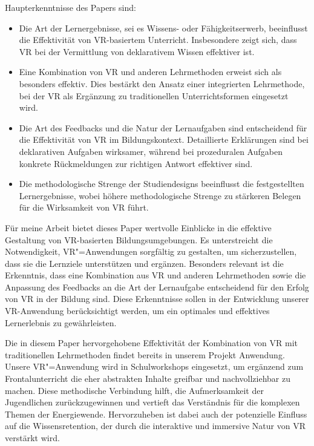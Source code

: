 \documentclass[draft]{vutinfth} %
\begin{document}
Haupterkenntnisse des Papers sind:
\begin{itemize}
    \item Die Art der Lernergebnisse, sei es Wissens- oder Fähigkeitserwerb, beeinflusst die Effektivität von VR-basiertem Unterricht. Insbesondere zeigt sich, dass VR bei der Vermittlung von deklarativem Wissen effektiver ist.

    \item Eine Kombination von VR und anderen Lehrmethoden erweist sich als besonders effektiv. Dies bestärkt den Ansatz einer integrierten Lehrmethode, bei der VR als Ergänzung zu traditionellen Unterrichtsformen eingesetzt wird.

    \item Die Art des Feedbacks und die Natur der Lernaufgaben sind entscheidend für die Effektivität von VR im Bildungskontext. Detaillierte Erklärungen sind bei deklarativen Aufgaben wirksamer, während bei prozeduralen Aufgaben konkrete Rückmeldungen zur richtigen Antwort effektiver sind.

    \item Die methodologische Strenge der Studiendesigns beeinflusst die festgestellten Lernergebnisse, wobei höhere methodologische Strenge zu stärkeren Belegen für die Wirksamkeit von VR führt.
\end{itemize}

Für meine Arbeit bietet dieses Paper wertvolle Einblicke in die effektive Gestaltung von VR-basierten Bildungsumgebungen. Es unterstreicht die Notwendigkeit, VR"=Anwendungen sorgfältig zu gestalten, um sicherzustellen, dass sie die Lernziele unterstützen und ergänzen. Besonders relevant ist die Erkenntnis, dass eine Kombination aus VR und anderen Lehrmethoden sowie die Anpassung des Feedbacks an die Art der Lernaufgabe entscheidend für den Erfolg von VR in der Bildung sind. Diese Erkenntnisse sollen in der Entwicklung unserer VR-Anwendung berücksichtigt werden, um ein optimales und effektives Lernerlebnis zu gewährleisten.

Die in diesem Paper hervorgehobene Effektivität der Kombination von VR mit traditionellen Lehrmethoden findet bereits in unserem Projekt Anwendung. Unsere VR"=Anwendung wird in Schulworkshops eingesetzt, um ergänzend zum Frontalunterricht die eher abstrakten Inhalte greifbar und nachvollziehbar zu machen. Diese methodische Verbindung hilft, die Aufmerksamkeit der Jugendlichen zurückzugewinnen und vertieft das Verständnis für die komplexen Themen der Energiewende. Hervorzuheben ist dabei auch der potenzielle Einfluss auf die Wissensretention, der durch die interaktive und immersive Natur von VR verstärkt wird.
\end{document}
